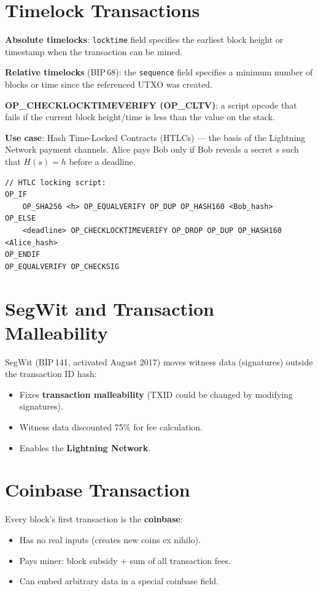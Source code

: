 \documentclass[12pt,a4paper,openany]{book}
\theoremstyle{definition}
\theoremstyle{plain}
\theoremstyle{remark}
\begin{document}
\section{Timelock Transactions}

\textbf{Absolute timelocks}: \texttt{locktime} field specifies the
earliest block height or timestamp when the transaction can be mined.

\textbf{Relative timelocks} (BIP\,68): the \texttt{sequence} field
specifies a minimum number of blocks or time since the referenced UTXO
was created.

\textbf{OP\_CHECKLOCKTIMEVERIFY (OP\_CLTV)}: a script opcode that fails
if the current block height/time is less than the value on the stack.

\textbf{Use case}: Hash Time-Locked Contracts (HTLCs) — the basis of
the Lightning Network payment channels.  Alice pays Bob only if Bob
reveals a secret $s$ such that $H(s)=h$ before a deadline.

\begin{lstlisting}[language={}]
// HTLC locking script:
OP_IF
    OP_SHA256 <h> OP_EQUALVERIFY OP_DUP OP_HASH160 <Bob_hash>
OP_ELSE
    <deadline> OP_CHECKLOCKTIMEVERIFY OP_DROP OP_DUP OP_HASH160 <Alice_hash>
OP_ENDIF
OP_EQUALVERIFY OP_CHECKSIG
\end{lstlisting}

\section{SegWit and Transaction Malleability}

SegWit (BIP\,141, activated August 2017) moves witness data (signatures)
outside the transaction ID hash:

\begin{itemize}
  \item Fixes \textbf{transaction malleability} (TXID could be changed by
        modifying signatures).
  \item Witness data discounted 75\% for fee calculation.
  \item Enables the \textbf{Lightning Network}.
\end{itemize}

\section{Coinbase Transaction}

Every block's first transaction is the \textbf{coinbase}:
\begin{itemize}
  \item Has no real inputs (creates new coins ex nihilo).
  \item Pays miner: block subsidy + sum of all transaction fees.
  \item Can embed arbitrary data in a special coinbase field.
\end{itemize}
\end{document}
